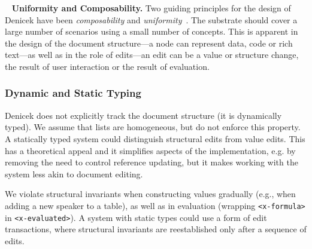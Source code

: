 \documentclass[sigconf,anonymous,screen]{acmart}
\newcommand{\ident}[1]{{\sffamily #1}}
\DeclareRobustCommand{\keyideabox}[3]{\begin{tcolorbox}[breakable,
  boxsep=5pt,left=0pt,right=0pt,top=0pt,bottom=0pt,width=\dimexpr\columnwidth\relax,
  colback=gray!20,colframe=gray!20,
  enlarge bottom by=0pt,enlarge top by=0pt,
  arc=0pt,outer arc=0pt]
\lettrine[lraise=0.3]{\LARGE #1}{~}
\small \textbf{#2.} #3
\end{tcolorbox}
}
\begin{document}
\keyideabox{\faCubes}{Uniformity and Composability}{
Two guiding principles for the design of Denicek have been \emph{composability} and
\emph{uniformity}~\cite{jakubovic-2023-techdims}. The substrate should cover a large number of
scenarios using a small number of concepts. This is apparent in the design of the document
structure---a node can represent data, code or rich text---as well as in the role of
edits---an edit can be a value or structure change, the result of user interaction or the
result of evaluation.
}


\subsubsection*{Dynamic and Static Typing}
Denicek does not explicitly track the document structure (it is dynamically typed). We assume that lists
are homogeneous, but do not enforce this property. A statically typed system could distinguish
structural edits from value edits. This has a theoretical appeal and it simplifies aspects
of the implementation, e.g. by removing the need to control reference updating, but it makes
working with the system less akin to document editing.

We violate structural invariants when constructing values gradually (e.g., when adding a new
speaker to a table), as well as in evaluation (wrapping {\small\Verb_<x-formula>_}
in {\small\Verb_<x-evaluated>_}). A system with static types could use a form of edit
transactions, where structural invariants are reestablished only after a sequence of edits.

%
\end{document}
